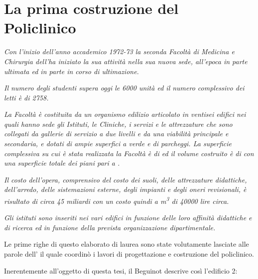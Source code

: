 \chapter{La prima costruzione del Policlinico}
\thispagestyle{empty}
 
\emph{Con l'inizio dell'anno accademico 1972-73 la seconda Facoltà di Medicina e Chirurgia dell'\uni ha iniziato la sua attività nella sua nuova sede, all'epoca in parte ultimata ed in parte in corso di ultimazione.}

\emph{Il numero degli studenti supera oggi le \num{6000} unità ed il numero complessivo dei letti è di \num{2758}.}

\emph{La Facoltà è costituita da un organismo edilizio articolato in ventisei edifici nei quali hanno sede gli Istituti, le Cliniche, i servizi e le attrezzature che sono collegati da gallerie di servizio a due livelli e da una viabilità principale e secondaria, e dotati di ampie superfici a verde e di parcheggi. La superficie complessiva su cui è stata realizzata la Facoltà è di  ed il volume costruito è di  con una superficie totale dei piani pari a .}

\emph{Il costo dell'opera, comprensivo del costo dei suoli, delle attrezzature didattiche, dell'arredo, delle sistemazioni esterne, degli impianti e degli oneri revisionali, è risultato di circa \num{45} miliardi con un costo quindi a \si{m^3} di \num{40000} lire circa.}

\emph{Gli istituti sono inseriti nei vari edifici in funzione delle loro affinità didattiche e di ricerca ed in funzione della prevista organizzazione dipartimentale.}

\vspace{0.5em}

\noindent Le prime righe di questo elaborato di laurea sono state volutamente lasciate alle parole dell' il quale coordinò i lavori di progettazione e costruzione del policlinico. 

Inerentemente all'oggetto di questa tesi, il Beguinot descrive così l'edificio 2:


